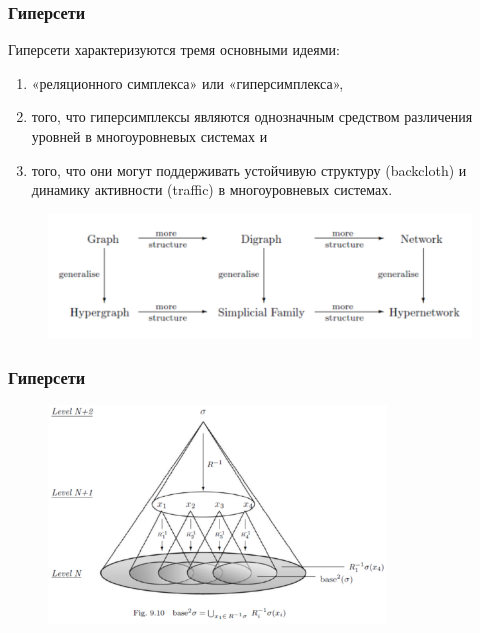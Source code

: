 \documentclass[default]{beamer}
\begin{document}
	\begin{frame}
		\frametitle{Гиперсети}
		
		Гиперсети характеризуются тремя основными идеями: 
		\begin{enumerate}
			\item «реляционного симплекса» или «гиперсимплекса», 
			\item того, что гиперсимплексы являются однозначным средством различения уровней в многоуровневых системах и 
			\item того, что они могут поддерживать устойчивую структуру (backcloth) и динамику активности (traffic) в многоуровневых системах.
		\end{enumerate}
		
		\begin{figure}
			\includegraphics[width=\textwidth]{gipergraph}
		\end{figure}
	\end{frame}	
		
	\begin{frame}	
		\frametitle{Гиперсети}
		
		\begin{figure}
			\includegraphics[width=0.8\textwidth]{gipergraph2}
		\end{figure}
	\end{frame}
	
\end{document}
